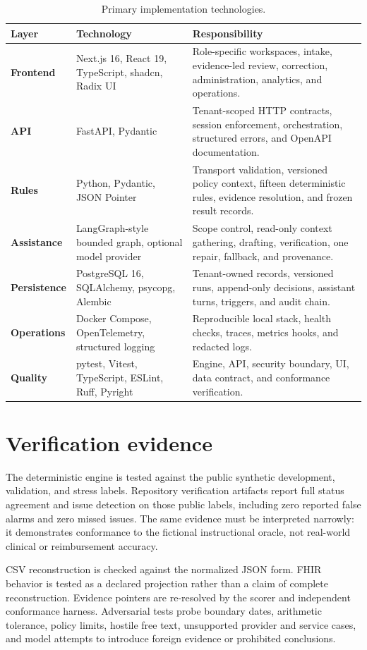 \documentclass[11pt,a4paper,oneside]{report}
\begin{document}
\begin{table}[H]
\centering
\caption{Primary implementation technologies.}
\begin{tabularx}{\textwidth}{>{\bfseries}p{38mm} p{43mm} X}
\toprule
Layer & Technology & Responsibility\\
\midrule
Frontend & Next.js 16, React 19, TypeScript, shadcn, Radix UI & Role-specific workspaces, intake, evidence-led review, correction, administration, analytics, and operations.\\
API & FastAPI, Pydantic & Tenant-scoped HTTP contracts, session enforcement, orchestration, structured errors, and OpenAPI documentation.\\
Rules & Python, Pydantic, JSON Pointer & Transport validation, versioned policy context, fifteen deterministic rules, evidence resolution, and frozen result records.\\
Assistance & LangGraph-style bounded graph, optional model provider & Scope control, read-only context gathering, drafting, verification, one repair, fallback, and provenance.\\
Persistence & PostgreSQL 16, SQLAlchemy, psycopg, Alembic & Tenant-owned records, versioned runs, append-only decisions, assistant turns, triggers, and audit chain.\\
Operations & Docker Compose, OpenTelemetry, structured logging & Reproducible local stack, health checks, traces, metrics hooks, and redacted logs.\\
Quality & pytest, Vitest, TypeScript, ESLint, Ruff, Pyright & Engine, API, security boundary, UI, data contract, and conformance verification.\\
\bottomrule
\end{tabularx}
\end{table}

\section{Verification evidence}
The deterministic engine is tested against the public synthetic development, validation, and stress labels. Repository verification artifacts report full status agreement and issue detection on those public labels, including zero reported false alarms and zero missed issues. The same evidence must be interpreted narrowly: it demonstrates conformance to the fictional instructional oracle, not real-world clinical or reimbursement accuracy.

CSV reconstruction is checked against the normalized JSON form. FHIR behavior is tested as a declared projection rather than a claim of complete reconstruction. Evidence pointers are re-resolved by the scorer and independent conformance harness. Adversarial tests probe boundary dates, arithmetic tolerance, policy limits, hostile free text, unsupported provider and service cases, and model attempts to introduce foreign evidence or prohibited conclusions.
\end{document}

